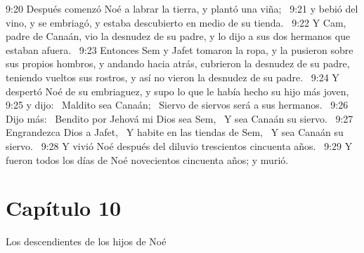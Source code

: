 9:20 Después comenzó Noé a labrar la tierra, y plantó una viña;  
9:21 y bebió del vino, y se embriagó, y estaba descubierto en medio de su tienda.  
9:22 Y Cam, padre de Canaán, vio la desnudez de su padre, y lo dijo a sus dos hermanos que estaban afuera.  
9:23 Entonces Sem y Jafet tomaron la ropa, y la pusieron sobre sus propios hombros, y andando hacia atrás, cubrieron la desnudez de su padre, teniendo vueltos sus rostros, y así no vieron la desnudez de su padre.  
9:24 Y despertó Noé de su embriaguez, y supo lo que le había hecho su hijo más joven,  
9:25 y dijo:  
Maldito sea Canaán;  
Siervo de siervos será a sus hermanos.  
9:26 Dijo más:  
Bendito por Jehová mi Dios sea Sem,  
Y sea Canaán su siervo.  
9:27 Engrandezca Dios a Jafet,  
Y habite en las tiendas de Sem,  
Y sea Canaán su siervo.  
9:28 Y vivió Noé después del diluvio trescientos cincuenta años.  
9:29 Y fueron todos los días de Noé novecientos cincuenta años; y murió. 
\section*{Capítulo 10}
Los descendientes de los hijos de Noé  

